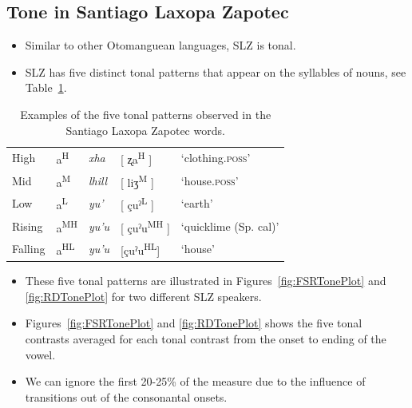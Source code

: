 \documentclass[12pt, letterpaper]{article}
\newcommand{\supr}[1]{\textsuperscript{#1}}
\providecommand{\lsptoprule}{\midrule\toprule}
\providecommand{\lspbottomrule}{\bottomrule\midrule}
\begin{document}
\subsection{Tone in Santiago Laxopa Zapotec} \label{sec:Tone}

\begin{itemize}
    \item Similar to other Otomanguean languages, SLZ is tonal\citep{suarezMesoamericanIndianLanguages1983,campbellMesoAmericaLinguisticArea1986,silvermanLaryngealComplexityOtomanguean1997,campbellOtomangueanHistoricalLinguistics2017a,campbellOtomangueanHistoricalLinguistics2017}.
    \item SLZ has five distinct tonal patterns that appear on the syllables of nouns, see Table~\ref{tab:tones}. 
\end{itemize}

\begin{table}[!h]
	\centering
	\caption{Examples of the five tonal patterns observed in the Santiago Laxopa Zapotec words.}
	\label{tab:tones}
	\begin{tabular}{lllll}
	\lsptoprule
	High   	&  a\supr{H}  &  \textit{xha}   &  [ ʐa\supr{H} ] & `clothing.\textsc{poss}'\\
	Mid    	&  a\supr{M}  &  \textit{lhill} 	& [ liʒ\supr{M} ] & `house.\textsc{poss}' \\
	Low   	&  a\supr{L}  &  \textit{yu'} 	&	 [ çuˀ\supr{L} ] & `earth'\\
	Rising	&  a\supr{MH}  &  \textit{yu'u} 	&	[ çuˀu\supr{MH} ] & `quicklime (Sp. cal)' \\
	Falling &  a\supr{HL}  &  \textit{yu'u}  &	[çuˀu\supr{HL}] &	`house' \\
	\lspbottomrule
	\end{tabular}
\end{table}

\begin{itemize}
	\item These five tonal patterns are illustrated in Figures~\ref{fig:FSRTonePlot} and \ref{fig:RDTonePlot} for two different SLZ speakers. 
	\item Figures~\ref{fig:FSRTonePlot} and \ref{fig:RDTonePlot} shows the five tonal contrasts averaged for each tonal contrast from the onset to ending of the vowel. 
	\item We can ignore the first 20-25\% of the measure due to the influence of transitions out of the consonantal onsets. 
\end{itemize}
\end{document}

